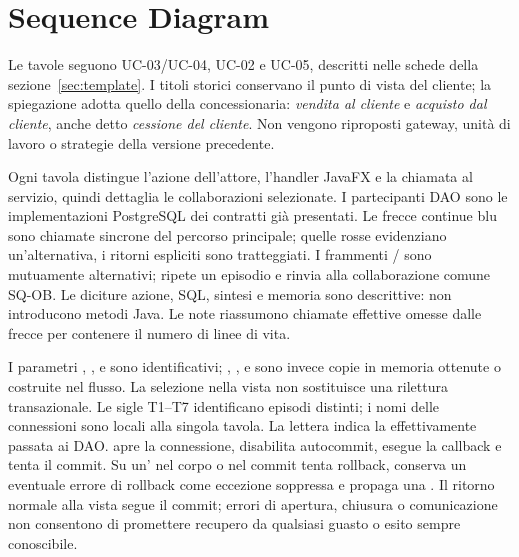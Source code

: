 \def\UrlBreaks{\do\a\do\b\do\c\do\d\do\e\do\f\do\g\do\h\do\i\do\j\do\k\do\l\do\m\do\n\do\o\do\p\do\q\do\r\do\s\do\t\do\u\do\v\do\w\do\x\do\y\do\z\do\A\do\B\do\C\do\D\do\E\do\F\do\G\do\H\do\I\do\J\do\K\do\L\do\M\do\N\do\O\do\P\do\Q\do\R\do\S\do\T\do\U\do\V\do\W\do\X\do\Y\do\Z}
\section{Sequence Diagram}\label{sec:sequenze}
Le tavole seguono UC-03/UC-04, UC-02 e UC-05, descritti nelle
schede della sezione~\ref{sec:template}. I titoli storici conservano il
punto di vista del cliente; la spiegazione adotta quello della concessionaria:
\emph{vendita al cliente} e \emph{acquisto dal cliente}, anche detto
\emph{cessione del cliente}. Non vengono riproposti gateway, unità di lavoro
o strategie della versione precedente.

Ogni tavola distingue l'azione dell'attore, l'handler JavaFX e la chiamata
al servizio, quindi dettaglia le collaborazioni selezionate. I partecipanti
DAO sono le implementazioni PostgreSQL dei contratti già presentati.
Le frecce continue blu sono chiamate sincrone del percorso principale;
quelle rosse evidenziano un'alternativa, i ritorni espliciti sono tratteggiati.
I frammenti / sono mutuamente alternativi; 
ripete un episodio e  rinvia alla collaborazione comune SQ-OB.
Le diciture \guillemotleft{}azione\guillemotright{}, \guillemotleft{}SQL\guillemotright{}, \guillemotleft{}sintesi\guillemotright{} e \guillemotleft{}memoria\guillemotright{} sono descrittive:
non introducono metodi Java. Le note riassumono chiamate effettive omesse
dalle frecce per contenere il numero di linee di vita.

I parametri , ,  e
 sono identificativi; , ,
 e  sono invece copie in memoria ottenute o
costruite nel flusso. La selezione nella vista non sostituisce una rilettura
transazionale. Le sigle T1--T7 identificano episodi distinti; i nomi delle connessioni
sono locali alla singola tavola. La lettera
 indica la  effettivamente passata ai DAO.
 apre la connessione, disabilita autocommit, esegue
la callback e tenta il commit. Su un' nel corpo o nel commit
tenta rollback, conserva un eventuale errore di rollback come eccezione
soppressa e propaga una . Il ritorno normale alla
vista segue il commit; errori di apertura, chiusura o comunicazione non
consentono di promettere recupero da qualsiasi guasto o esito sempre conoscibile.

